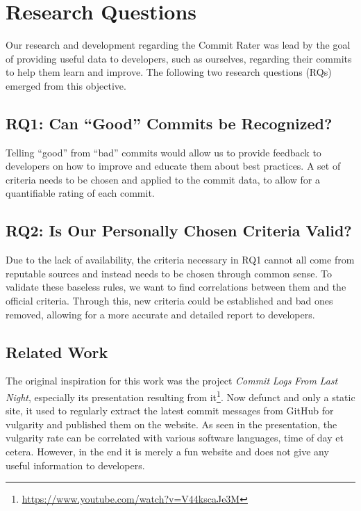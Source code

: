 \section{Research Questions}
\label{sec:research-questions}

Our research and development regarding the Commit Rater was lead by the goal of providing useful data to developers, such as ourselves, regarding their commits to help them learn and improve. The following two research questions (RQs) emerged from this objective.


\subsection{RQ1: Can ``Good'' Commits be Recognized?}
\label{sec:rq1}

Telling ``good'' from ``bad'' commits would allow us to provide feedback to developers on how to improve and educate them about best practices. A set of criteria needs to be chosen and applied to the commit data, to allow for a quantifiable rating of each commit.


\subsection{RQ2: Is Our Personally Chosen Criteria Valid?}
\label{sec:rq2}

Due to the lack of availability, the criteria necessary in RQ1 cannot all come from reputable sources and instead needs to be chosen through common sense. To validate these baseless rules, we want to find correlations between them and the official criteria. Through this, new criteria could be established and bad ones removed, allowing for a more accurate and detailed report to developers.


\subsection{Related Work}
\label{sec:related-work}

The original inspiration for this work was the project \emph{Commit} \emph{Logs} \emph{From} \emph{Last} \emph{Night}\cite{LastNight}, especially its presentation resulting from it\footnote{\url{https://www.youtube.com/watch?v=V44kscaJe3M}}. Now defunct and only a static site, it used to regularly extract the latest commit messages from GitHub for vulgarity and published them on the website. As seen in the presentation, the vulgarity rate can be correlated with various software languages, time of day et cetera. However, in the end it is merely a fun website and does not give any useful information to developers.

